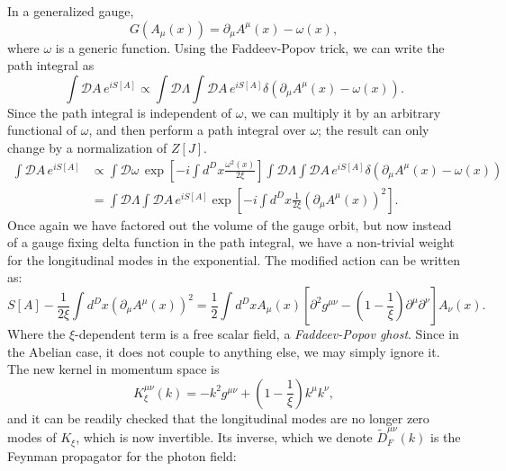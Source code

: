 \documentclass{article}
\numberwithin{equation}{section}
\begin{document}
In a generalized gauge,
\begin{equation}
    G(A_\mu(x)) = \partial_\mu A^\mu(x) - \omega(x),
\end{equation}
where $\omega$ is a generic function. Using the Faddeev-Popov trick, we can write the path integral as 
\begin{equation}
    \int \mathcal{D}A\, e^{iS[A]} \propto \int \mathcal{D}\Lambda \int \mathcal{D}A\, e^{iS[A]} \delta\left(\partial_\mu A^\mu(x) - \omega(x)\right).
\end{equation}
Since the path integral is independent of $\omega$, we can multiply it by an arbitrary functional of $\omega$, and then perform a path integral over $\omega$; the result can only change by a normalization of $Z[J]$.
\begin{equation}
\begin{aligned}
    \int \mathcal{D}A\, e^{iS[A]} &\propto \int \mathcal{D} \omega \, \exp\left[-i \int d^Dx \frac{\omega^2(x)}{2\xi}\right] \int \mathcal{D}\Lambda \int \mathcal{D}A\, e^{iS[A]} \delta\left(\partial_\mu A^\mu(x) - \omega(x)\right) \\
    &= \int \mathcal{D} \Lambda \int \mathcal{D} A \, e^{iS[A]} \exp\left[-i \int d^Dx \frac{1}{2\xi} (\partial_\mu A^\mu(x))^2\right].
\end{aligned}
\end{equation}
Once again we have factored out the volume of the gauge orbit, but now instead of a gauge fixing delta function in the path integral, we have a non-trivial weight for the longitudinal modes in the exponential. The modified action can be written as:
\begin{equation}
    S[A] - \frac{1}{2\xi} \int d^Dx \left(\partial_\mu A^\mu(x)\right)^2 = \frac{1}{2} \int d^Dx A_\mu(x) \left[\partial^2 g^{\mu\nu} - \left(1 - \frac{1}{\xi}\right)\partial^\mu \partial^\nu\right] A_\nu(x).
\end{equation}
Where the $\xi$-dependent term is a free scalar field, a \textit{Faddeev-Popov ghost}. Since in the Abelian case, it does not couple to anything else, we may simply ignore it. The new kernel in momentum space is 
\begin{equation}
    K_\xi^{\mu\nu}(k) = -k^2 g^{\mu\nu} + \left(1 - \frac{1}{\xi}\right) k^\mu k^\nu,
\end{equation}
and it can be readily checked that the longitudinal modes are no longer zero modes of $K_\xi$, which is now invertible. Its inverse, which we denote $\tilde{D}_F^{\mu\nu}(k)$ is the Feynman propagator for the photon field:
\end{document}
